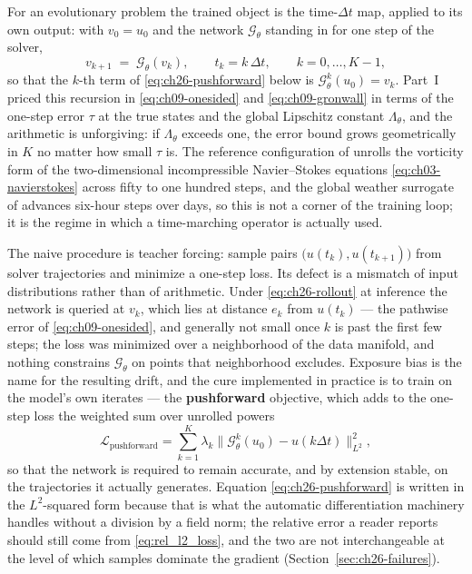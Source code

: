 For an evolutionary problem the trained object is the time-$\Delta t$ map, applied to its
own output: with $v_0 = u_0$ and the network $\mathcal{G}_\theta$ standing in for one step
of the solver,
\begin{equation}
  \label{eq:ch26-rollout}
  v_{k+1} \;=\; \mathcal{G}_\theta(v_k), \qquad t_k = k\,\Delta t, \qquad k = 0, \dots, K-1,
\end{equation}
so that the $k$-th term of \eqref{eq:ch26-pushforward} below is $\mathcal{G}_\theta^k(u_0)
= v_k$. Part~I priced this recursion in \eqref{eq:ch09-onesided} and \eqref{eq:ch09-gronwall}
in terms of the one-step error $\tau$ at the true states and the global Lipschitz constant
$\Lambda_\theta$, and the arithmetic is unforgiving: if $\Lambda_\theta$ exceeds one, the
error bound grows geometrically in $K$ no matter how small $\tau$ is. The reference
configuration of  unrolls the
vorticity form of the two-dimensional incompressible Navier--Stokes equations
\eqref{eq:ch03-navierstokes} across fifty to one hundred steps, and the global weather
surrogate of \cite{pathak2022fourcastnet} advances six-hour steps over days, so this is not
a corner of the training loop; it is the regime in which a time-marching operator is
actually used.

The naive procedure is teacher forcing: sample pairs $\big(u(t_k), u(t_{k+1})\big)$ from
solver trajectories and minimize a one-step loss. Its defect is a mismatch of input
distributions rather than of arithmetic. Under \eqref{eq:ch26-rollout} at inference the
network is queried at $v_k$, which lies at distance $e_k$ from $u(t_k)$ --- the pathwise
error of \eqref{eq:ch09-onesided}, and generally not small once $k$ is past the first few
steps; the loss was minimized over a neighborhood of the data manifold, and
nothing constrains $\mathcal{G}_\theta$ on points that neighborhood excludes. Exposure bias
is the name for the resulting drift, and the cure implemented in practice is to train on the
model's own iterates --- the \textbf{pushforward} objective, which adds to the one-step loss
the weighted sum over unrolled powers
\begin{equation}
  \label{eq:ch26-pushforward}
  \mathcal{L}_{\text{pushforward}} = \sum_{k=1}^K \lambda_k \big\| \mathcal{G}_\theta^k(u_0) - u(k\Delta t) \big\|_{L^2}^2,
\end{equation}
so that the network is required to remain accurate, and by extension stable, on the
trajectories it actually generates. Equation \eqref{eq:ch26-pushforward} is written in the
$L^2$-squared form because that is what the automatic differentiation machinery handles
without a division by a field norm; the relative error a reader reports should still come
from \eqref{eq:rel_l2_loss}, and the two are not interchangeable at the level of which
samples dominate the gradient (Section~\ref{sec:ch26-failures}).

